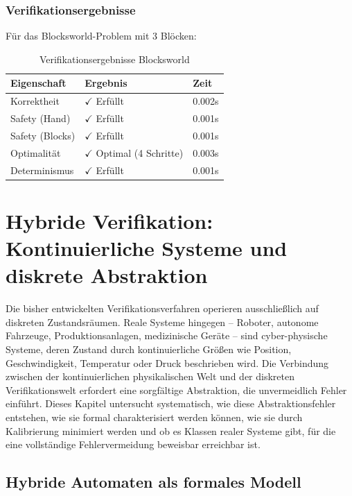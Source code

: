 ﻿\documentclass[a4paper,12pt]{article}
\theoremstyle{definition}
\begin{document}
\subsubsection{Verifikationsergebnisse}

Für das Blocksworld-Problem mit 3 Blöcken:

\begin{table}[h]
	\centering
	\caption{Verifikationsergebnisse Blocksworld}
	\label{tab:blocksworld_verification}
	\begin{tabular}{lll}
		\toprule
		Eigenschaft & Ergebnis & Zeit \\
		\midrule
		Korrektheit & $\checkmark$ Erfüllt & 0.002s \\
		Safety (Hand) & $\checkmark$ Erfüllt & 0.001s \\
		Safety (Blocks) & $\checkmark$ Erfüllt & 0.001s \\
		Optimalität & $\checkmark$ Optimal (4 Schritte) & 0.003s \\
		Determinismus & $\checkmark$ Erfüllt & 0.001s \\
		\bottomrule
	\end{tabular}
\end{table}

\section{Hybride Verifikation: Kontinuierliche Systeme und diskrete Abstraktion}

Die bisher entwickelten Verifikationsverfahren operieren ausschließlich auf diskreten Zustandsräumen. Reale Systeme hingegen -- Roboter, autonome Fahrzeuge, Produktionsanlagen, medizinische Geräte -- sind cyber-physische Systeme, deren Zustand durch kontinuierliche Größen wie Position, Geschwindigkeit, Temperatur oder Druck beschrieben wird. Die Verbindung zwischen der kontinuierlichen physikalischen Welt und der diskreten Verifikationswelt erfordert eine sorgfältige Abstraktion, die unvermeidlich Fehler einführt. Dieses Kapitel untersucht systematisch, wie diese Abstraktionsfehler entstehen, wie sie formal charakterisiert werden können, wie sie durch Kalibrierung minimiert werden und ob es Klassen realer Systeme gibt, für die eine vollständige Fehlervermeidung beweisbar erreichbar ist.

\subsection{Hybride Automaten als formales Modell}
\end{document}
